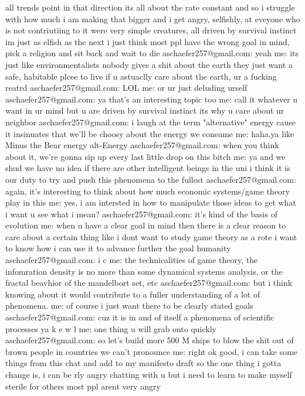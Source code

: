 all trends point in that direction
its all about the rate constant
and so i struggle with how much i am making that bigger
and i get angry, selfishly, at eveyone who is not contriutiing to it
were very simple creatures, all driven by survival instinct
im just as elfish as the next
i just think most ppl have the wrong goal in mind, pick a religion and sit back and wait to die
 aschaefer257@gmail.com:  yeah
 me:  its just like environmentalists
nobody gives a shit about the earth
they just want a safe, habitable plcee to live
if u astuaclly care about the earth, ur a fucking reatrd
 aschaefer257@gmail.com:  LOL
 me:  or ur just deluding urself
 aschaefer257@gmail.com:  ya that's an interesting topic too
 me:  call it whatever u want in ur mind
but u are driven by survival instinct
its why u care about ur neighbor
 aschaefer257@gmail.com:  i laugh at the term "alternative" energy cause it insinuates that we'll be choosy about the energy we consume
 me:  haha,ya like Minus the Bear energy
alt-Energy
 aschaefer257@gmail.com:  when you think about it, we're gonna sip up every last little drop on this bitch
 me:  ya and we shud
we have no idea if there are other intelligent beings in the uni
i think it is our duty to try and push this phenomena to the fullest
 aschaefer257@gmail.com:  again, it's interesting to think about how much economic systems/game theory play in this
 me:  yes, i am intersted in how to manipulate those ideas to get what i want
u see what i mean?
 aschaefer257@gmail.com:  it's kind of the basis of evolution
 me:  when u have a clear goal in mind
then there is a clear reason to care about a certain thing
like i dont want to study game theory as a rote
i want to know how i can use it to advance further the goal humanity
 aschaefer257@gmail.com:  i c
 me:  the technicalities of game theory, the infomration density
is no more than some dynamical systems analysis, or the fractal beavhior of the mandelbort set, etc
 aschaefer257@gmail.com:  but i think knowing about it would contribute to a fuller understanding of a lot of phenomena.
 me:  of course
i just want there to be clearly stated goals
 aschaefer257@gmail.com:  cuz it is in and of itself a phenomena of scientific processes
ya
k e w l
 me:  one thing u will grab onto quickly
 aschaefer257@gmail.com:  so let's build more 500 M ships to blow the shit out of brown people in countries we can't pronounce
 me:  right
ok good, i can take some things from this chat and add to my manifesto draft
so the one thing i gotta change is, i can be rly angry chatting with u
but i need to learn to make myself sterile for others
most ppl arent very angry

